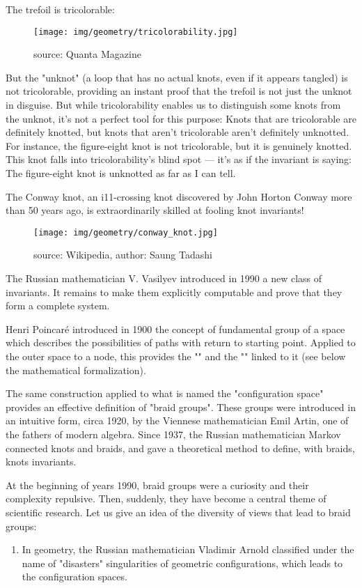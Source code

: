 {	The trefoil is tricolorable:
	\begin{figure}[H]
		\centering
		\texttt{[image: img/geometry/tricolorability.jpg]}
		\caption[]{source: Quanta Magazine}
	\end{figure}
	But the "unknot" (a loop that has no actual knots, even if it appears tangled) is not tricolorable, providing an instant proof that the trefoil is not just the unknot in disguise. But while tricolorability enables us to distinguish some knots from the unknot, it's not a perfect tool for this purpose: Knots that are tricolorable are definitely knotted, but knots that aren't tricolorable aren't definitely unknotted. For instance, the figure-eight knot is not tricolorable, but it is genuinely knotted. This knot falls into tricolorability’s blind spot — it's as if the invariant is saying: \og The figure-eight knot is unknotted as far as I can tell\fg{}.
	
	The Conway knot, an i11-crossing knot discovered by John Horton Conway more than 50 years ago, is extraordinarily skilled at fooling knot invariants!
	\begin{figure}[H]
		\centering
		\texttt{[image: img/geometry/conway\_knot.jpg]}
		\caption[]{source: Wikipedia, author: Saung Tadashi}
	\end{figure}
	The Russian mathematician V. Vasilyev introduced in 1990 a new class of invariants. It remains to make them explicitly computable and prove that they form a complete system.
	
	Henri Poincaré introduced in 1900 the concept of fundamental group of a space which describes the possibilities of paths with return to starting point. Applied to the outer space to a node, this provides the "" and the "" linked to it (see below the mathematical formalization).
	
	The same construction applied to what is named the "configuration space" provides an effective definition of "braid groups". These groups were introduced in an intuitive form, circa 1920, by the Viennese mathematician Emil Artin, one of the fathers of modern algebra. Since 1937, the Russian mathematician Markov connected knots and braids, and gave a theoretical method to define, with braids, knots invariants.
	
	At the beginning of years 1990, braid groups were a curiosity and their complexity repulsive. Then, suddenly, they have become a central theme of scientific research. Let us give an idea of the diversity of views that lead to braid groups:
	\begin{enumerate}
		\item In geometry, the Russian mathematician Vladimir Arnold classified under the name of "disasters" singularities of geometric configurations, which leads to the configuration spaces.
		

\end{enumerate}}
